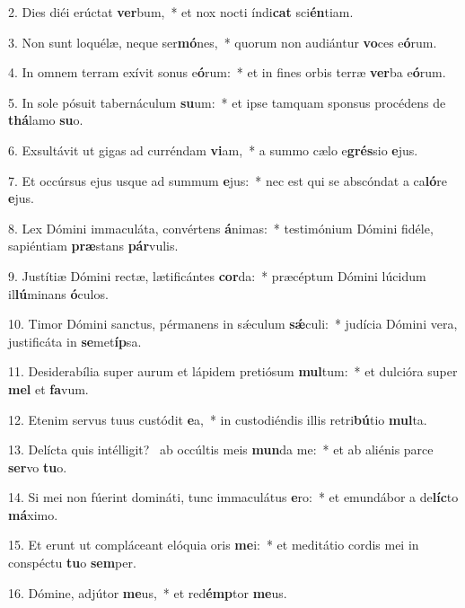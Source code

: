 2. Dies diéi erúctat \textbf{ver}bum,~*  et nox nocti índi\textbf{cat} sci\textbf{én}tiam.\

3. Non sunt loquélæ, neque ser\textbf{mó}nes,~*  quorum non audiántur \textbf{vo}ces e\textbf{ó}rum.\

4. In omnem terram exívit sonus e\textbf{ó}rum:~*  et in fines orbis terræ \textbf{ver}ba e\textbf{ó}rum.\

5. In sole pósuit tabernáculum \textbf{su}um:~*  et ipse tamquam sponsus procédens de \textbf{thá}lamo \textbf{su}o.\

6. Exsultávit ut gigas ad curréndam \textbf{vi}am,~*  a summo cælo e\textbf{grés}sio \textbf{e}jus.\

7. Et occúrsus ejus usque ad summum \textbf{e}jus:~*  nec est qui se abscóndat a ca\textbf{ló}re \textbf{e}jus.\

8. Lex Dómini immaculáta, convértens \textbf{á}nimas:~*  testimónium Dómini fidéle, sapiéntiam \textbf{præ}stans \textbf{pár}vulis.\

9. Justítiæ Dómini rectæ, lætificántes \textbf{cor}da:~*  præcéptum Dómini lúcidum il\textbf{lú}minans \textbf{ó}culos.\

10. Timor Dómini sanctus, pérmanens in sǽculum \textbf{sǽ}culi:~*  judícia Dómini vera, justificáta in \textbf{se}met\textbf{íp}sa.\

11. Desiderabília super aurum et lápidem pretiósum \textbf{mul}tum:~*  et dulcióra super \textbf{mel} et \textbf{fa}vum.\

12. Etenim servus tuus custódit \textbf{e}a,~*  in custodiéndis illis retri\textbf{bú}tio \textbf{mul}ta.\

13. Delícta quis intélligit? \dag\  ab occúltis meis \textbf{mun}da me:~*  et ab aliénis parce \textbf{ser}vo \textbf{tu}o.\

14. Si mei non fúerint domináti, tunc immaculátus \textbf{e}ro:~*  et emundábor a de\textbf{líc}to \textbf{má}ximo.\

15. Et erunt ut compláceant elóquia oris \textbf{me}i:~*  et meditátio cordis mei in conspéctu \textbf{tu}o \textbf{sem}per.\

16. Dómine, adjútor \textbf{me}us,~*  et red\textbf{émp}tor \textbf{me}us.\

